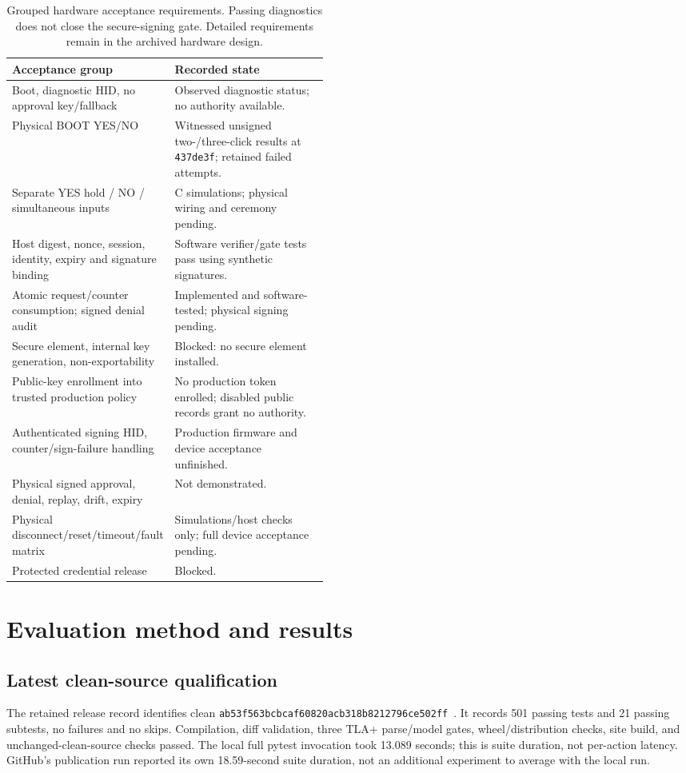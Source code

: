 \documentclass[journal]{IEEEtran}
\newcommand{\code}[1]{\texttt{#1}}
\begin{document}
\begin{table}[!t]
\small\begin{tabularx}{\linewidth}{@{}p{0.46\linewidth}Y@{}}
\toprule Acceptance group & Recorded state \\
\midrule
Boot, diagnostic HID, no approval key/fallback & Observed diagnostic status; no authority available.\\
Physical BOOT YES/NO & Witnessed unsigned two-/three-click results at \code{437de3f}; retained failed attempts.\\
Separate YES hold / NO / simultaneous inputs & C simulations; physical wiring and ceremony pending.\\
Host digest, nonce, session, identity, expiry and signature binding & Software verifier/gate tests pass using synthetic signatures.\\
Atomic request/counter consumption; signed denial audit & Implemented and software-tested; physical signing pending.\\
Secure element, internal key generation, non-exportability & Blocked: no secure element installed.\\
Public-key enrollment into trusted production policy & No production token enrolled; disabled public records grant no authority.\\
Authenticated signing HID, counter/sign-failure handling & Production firmware and device acceptance unfinished.\\
Physical signed approval, denial, replay, drift, expiry & Not demonstrated.\\
Physical disconnect/reset/timeout/fault matrix & Simulations/host checks only; full device acceptance pending.\\
Protected credential release & Blocked.\\
\bottomrule
\end{tabularx}\caption{Grouped hardware acceptance requirements. Passing diagnostics does not close the secure-signing gate. Detailed requirements remain in the archived hardware design.}
\end{table}

\section{Evaluation method and results}
\subsection{Latest clean-source qualification}
The retained release record identifies clean \nolinkurl{ab53f563bcbcaf60820acb318b8212796ce502ff}~\cite{evidence}. It records 501 passing tests and 21 passing subtests, no failures and no skips. Compilation, diff validation, three TLA+ parse/model gates, wheel/distribution checks, site build, and unchanged-clean-source checks passed. The local full pytest invocation took 13.089 seconds; this is suite duration, not per-action latency. GitHub's publication run reported its own 18.59-second suite duration, not an additional experiment to average with the local run.
\end{document}
